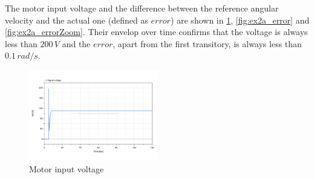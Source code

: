 \documentclass[11pt,a4paper,oneside]{article}
\begin{document}
The motor input voltage and the difference between the reference angular velocity and the actual one (defined as $error$) are shown in \cref{fig:ex2a_voltage}, \cref{fig:ex2a_error} and \cref{fig:ex2a_errorZoom}.
Their envelop over time confirms that the voltage is always less than $200\,V$ and the $error$, apart from the first transitory, is always less than $0.1\,rad/s$.
\begin{figure}[H]
    \centering
    \includegraphics*[width=0.5\textwidth, keepaspectratio]{Figures/ex2a_voltage.pdf}
    \caption[]{\label{fig:ex2a_voltage} Motor input voltage}
\end{figure}
\end{document}
